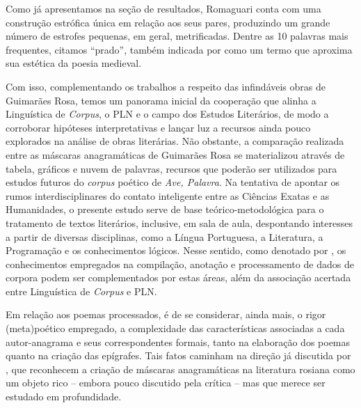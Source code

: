 \documentclass[portuguese]{textolivre}
\begin{document}
Como já apresentamos na seção de resultados, Romaguari conta com uma construção estrófica única em relação aos seus pares, produzindo um grande número de estrofes pequenas, em geral, metrificadas. Dentre as 10 palavras mais frequentes, citamos “prado”, também indicada por \textcite{rossi_as_2007} como um termo que aproxima sua estética da poesia medieval. 

Com isso, complementando os trabalhos a respeito das infindáveis obras de Guimarães Rosa, temos um panorama inicial da cooperação que alinha a Linguística de \textit{Corpus}, o PLN e o campo dos Estudos Literários, de modo a corroborar hipóteses interpretativas e lançar luz a recursos ainda pouco explorados na análise de obras literárias. Não obstante, a comparação realizada entre as máscaras anagramáticas de Guimarães Rosa se materializou através de tabela, gráficos e nuvem de palavras, recursos que poderão ser utilizados para estudos futuros do \textit{corpus} poético de \textit{Ave, Palavra}. Na tentativa de apontar os rumos interdisciplinares do contato inteligente entre as Ciências Exatas e as Humanidades, o presente estudo serve de base teórico-metodológica para o tratamento de textos literários, inclusive, em sala de aula, despontando interesses a partir de diversas disciplinas, como a Língua Portuguesa, a Literatura, a Programação e os conhecimentos lógicos. Nesse sentido, como denotado por \textcite{finatto_processamento_2015}, os conhecimentos empregados na compilação, anotação e processamento de dados de corpora podem ser complementados por estas áreas, além da associação acertada entre Linguística de \textit{Corpus} e PLN.
	
Em relação aos poemas processados, é de se considerar, ainda mais, o rigor (meta)poético empregado, a complexidade das características associadas a cada autor-anagrama e seus correspondentes formais, tanto na elaboração dos poemas quanto na criação das epígrafes. Tais fatos caminham na direção já discutida por \textcite{rossi_as_2007,vital_uma_2021}, que reconhecem a criação de máscaras anagramáticas na literatura rosiana como um objeto rico – embora pouco discutido pela crítica – mas que merece ser estudado em profundidade.

\printbibliography\label{sec-bib}
\end{document}
